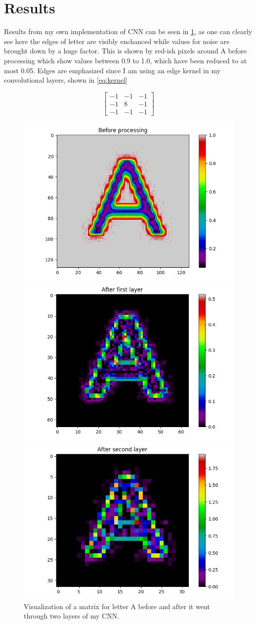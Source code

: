 \documentclass[conference]{IEEEtran}
\begin{document}
\section{Results}
Results from my own implementation of CNN can be seen in \cref{fig:FirstPart}, as one can clearly see here the edges of letter are visibly enchanced while values for noise are brought down by a huge factor. This is shown by red-ish pixels around A before processing which show values between 0.9 to 1.0, which have been reduced to at most 0.05. Edges are emphasized since I am using an edge kernel in my convolutional layers, shown in \cref{eq:kernel}

\begin{equation}
\begin{bmatrix} 
-1 & -1 & -1 \\ 
-1 & 8 & -1 \\ 
-1 & -1 & -1
\end{bmatrix}
\label{eq:kernel}
\end{equation}

\begin{figure}[htbp]
  \centerline{\includegraphics[width=.4\textwidth]{A_Zero_Layer}}
  \centerline{\includegraphics[width=.4\textwidth]{A_First_Layer}}
  \centerline{\includegraphics[width=.4\textwidth]{A_Second_Layer}}
\caption{Visualization of a matrix for letter A before and after it went through two layers of my CNN.}
\label{fig:FirstPart}
\end{figure}
\end{document}

